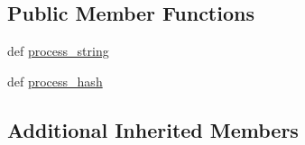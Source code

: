 \subsection*{Public Member Functions}
\begin{DoxyCompactItemize}
\item 
def \hyperlink{classcheshire3_1_1base_objects_1_1_token_merger_a19f86160d5092fd1e6757732645daa33}{process\-\_\-string}
\item 
def \hyperlink{classcheshire3_1_1base_objects_1_1_token_merger_aed4bae17bf842909ccaa4332e3a221ef}{process\-\_\-hash}
\end{DoxyCompactItemize}
\subsection*{Additional Inherited Members}


